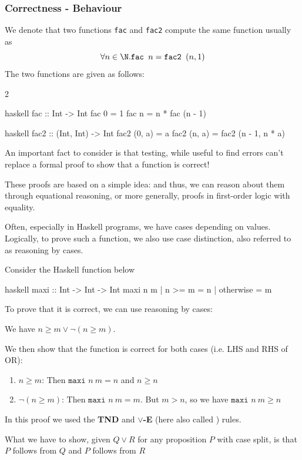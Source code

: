 \subsubsection{Correctness - Behaviour}
We denote that two functions \texttt{fac} and \texttt{fac2} compute the same function usually as
\[
    \forall n \in \N. \texttt{fac } n = \texttt{fac2 } (n, 1)
\]
The two functions are given as follows:
\begin{multicols}{2}
    \begin{code}{haskell}
        fac :: Int -> Int
        fac 0 = 1
        fac n = n * fac (n - 1)
    \end{code}
    \begin{code}{haskell}
        fac2 :: (Int, Int) -> Int
        fac2 (0, a) = a
        fac2 (n, a) = fac2 (n - 1, n * a)
    \end{code}
\end{multicols}
An important fact to consider is that testing, while useful to find errors can't replace a formal proof to show that a function is correct!

These proofs are based on a simple idea:  and thus, we can reason about them through equational reasoning, or more generally,
proofs in first-order logic with equality.

Often, especially in Haskell programs, we have cases depending on values. Logically, to prove such a function, we also use case distinction, also referred to as reasoning by cases.

\inlineexample Consider the Haskell function below \rmvspace
\begin{code}{haskell}
    maxi :: Int -> Int -> Int
    maxi n m
        | n >= m    = n
        | otherwise = m
\end{code}
To prove that it is correct, we can use reasoning by cases:

We have $n \geq m \lor \neg(n \geq m)$.

We then show that the function is correct for both cases (i.e. LHS and RHS of OR):
\begin{enumerate}[label=C\arabic*]
    \item $n \geq m$: Then $\texttt{maxi } n \ m = n$ and $n \geq n$
    \item $\neg(n \geq m)$: Then $\texttt{maxi } n \ m = m$. But $m > n$, so we have $\texttt{maxi } n\ m \geq n$
\end{enumerate}
In this proof we used the \textbf{TND} and \textbf{$\lor$-E} (here also called ) rules.

What we have to show, given $Q \lor R$ for any proposition $P$ with case split, is that  $P$ follows from $Q$ and  $P$ follows from $R$
